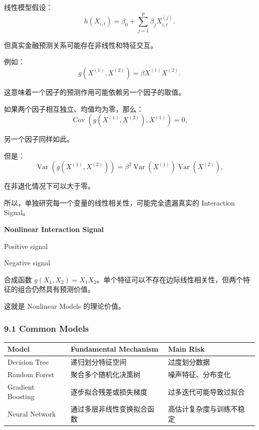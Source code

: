 线性模型假设：
\[h(X_{i,t})
=
\beta_0+
\sum_{j=1}^{p}\beta_jX_{i,t}^{(j)}.\]

但真实金融预测关系可能存在非线性和特征交互。

例如：
\[g(X^{(1)},X^{(2)})
=
\beta X^{(1)}X^{(2)}.\]

这意味着一个因子的预测作用可能依赖另一个因子的取值。

如果两个因子相互独立、均值均为零，那么：
\[\operatorname{Cov}(g(X^{(1)},X^{(2)}),X^{(1)})=0,\]

另一个因子同样如此。

但是：
\[\operatorname{Var}(g(X^{(1)},X^{(2)}))
=
\beta^2
\operatorname{Var}(X^{(1)})
\operatorname{Var}(X^{(2)}),\]

在非退化情况下可以大于零。

所以，单独研究每一个变量的线性相关性，可能完全遗漏真实的 Interaction Signal。

\textbf{Nonlinear Interaction Signal}


Positive signal

Negative signal

合成函数 \(g(X_1,X_2)=X_1X_2\)。单个特征可以不存在边际线性相关性，但两个特征的组合仍然具有预测价值。

这就是 Nonlinear Models 的理论价值。

\hypertarget{part-4-63-0001-common-models}{%
\subsubsection{9.1 Common Models}\label{part-4-63-0001-common-models}}

\begin{readertable}
\begin{longtable}[]{@{}
  >{\raggedright\arraybackslash}p{}
  >{\raggedright\arraybackslash}p{}
  >{\raggedright\arraybackslash}p{}@{}}
\toprule
Model & Fundamental Mechanism & Main Risk \\
\midrule
\endhead
Decision Tree & 递归划分特征空间 & 过度划分数据 \\
Random Forest & 聚合多个随机化决策树 & 噪声特征、分布变化 \\
Gradient Boosting & 逐步拟合残差或损失梯度 & 过多迭代可能导致过拟合 \\
Neural Network & 通过多层非线性变换拟合函数 & 高估计复杂度与训练不稳定 \\
\bottomrule
\end{longtable}
\end{readertable}

